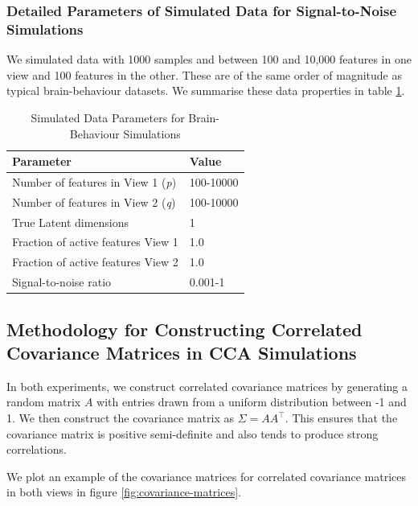 \subsubsection{Detailed Parameters of Simulated Data for Signal-to-Noise Simulations}
We simulated data with 1000 samples and between 100 and 10,000 features in one view and 100 features in the other.
These are of the same order of magnitude as typical brain-behaviour datasets.
We summarise these data properties in table \ref{tab:simulated-data-parameters-bb}.

\begin{table}
    \centering
    \caption{Simulated Data Parameters for Brain-Behaviour Simulations}
    \begin{tabular}{| l | l |}
        \hline
        \textbf{Parameter}                        & \textbf{Value}                               \\
        \hline
        Number of features in View 1 (\textit{p}) & 100-10000 \\
        Number of features in View 2 (\textit{q}) & 100-10000 \\
        True Latent dimensions                    & 1                                            \\
        Fraction of active features View 1            & 1.0                                          \\
        Fraction of active features View 2            & 1.0                                          \\
        Signal-to-noise ratio                    & 0.001-1 \\
        \hline
    \end{tabular}\label{tab:simulated-data-parameters-bb}
\end{table}

\subsection{Methodology for Constructing Correlated Covariance Matrices in CCA Simulations}

In both experiments, we construct correlated covariance matrices by generating a random matrix $A$ with entries drawn from a uniform distribution between -1 and 1.
We then construct the covariance matrix as $\Sigma = AA^\top$.
This ensures that the covariance matrix is positive semi-definite and also tends to produce strong correlations.

We plot an example of the covariance matrices for correlated covariance matrices in both views in figure \ref{fig:covariance-matrices}.

